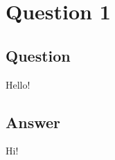 \documentclass[a4paper, 12pt]{scrartcl}
\newenvironment{question}[1]{
    \section*{Question #1}
    \subsection*{Question}
    \begin{itshape}
}
{
    \end{itshape}
}
\newenvironment{answer}{
    \subsection*{Answer}
}{\par}
\begin{document}
\maketitle

\begin{question}{1}
    Hello!
\end{question}
\begin{answer}
    Hi!
\end{answer}
\end{document}

